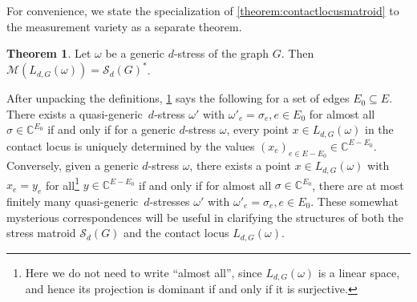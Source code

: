 \documentclass[11pt,a4paper,dvipsnames]{scrartcl}
\theoremstyle{definition}
\newtheorem{theorem}{Theorem}[section]
\newcommand{\CC}{\mathbb{C}}
\newcommand{\algmat}[1]{\mathcal{M}(#1)}
\newcommand{\stressmatroid}[2]{\mathcal{S}_{#1}(#2)}
\newcommand{\contactlocus}[2]{L_{#1,#2}}
\newcommand{\quasigen}{quasi-generic}
\begin{document}
For convenience, we state the specialization of \cref{theorem:contactlocusmatroid} to the measurement variety as a separate theorem.
\begin{theorem}\label{theorem:rigiditycontactlocusmatroid}
    Let $\omega$ be a generic $d$-stress of the graph $G$. Then $\algmat{\contactlocus{d}{G}(\omega)} = \stressmatroid{d}{G}^*$.
\end{theorem}

After unpacking the definitions, \cref{theorem:rigiditycontactlocusmatroid} says the following for a set of edges $E_0 \subseteq E$. There exists a \quasigen\ $d$-stress $\omega'$ with $\omega'_e = \sigma_e, e \in E_0$ for almost all $\sigma \in \CC^{E_0}$ if and only if for a generic $d$-stress $\omega$, every point $x \in \contactlocus{d}{G}(\omega)$ in the contact locus is uniquely determined by the values ${(x_e)}_{e \in E - E_0} \in \CC^{E - E_0}$. Conversely, given a generic $d$-stress $\omega$, there exists a point $x \in \contactlocus{d}{G}(\omega)$ with $x_e = y_e$ for all\footnote{Here we do not need to write ``almost all'', since $\contactlocus{d}{G}(\omega)$ is a linear space, and hence its projection is dominant if and only if it is surjective.} $y \in \CC^{E - E_0}$ if and only if for almost all $\sigma \in \CC^{E_0}$, there are at most finitely many \quasigen\ $d$-stresses $\omega'$ with $\omega'_e = \sigma_e, e \in E_0$. These somewhat mysterious correspondences will be useful in clarifying the structures of both the stress matroid $\stressmatroid{d}{G}$ and the contact locus $\contactlocus{d}{G}(\omega)$.
\end{document}
